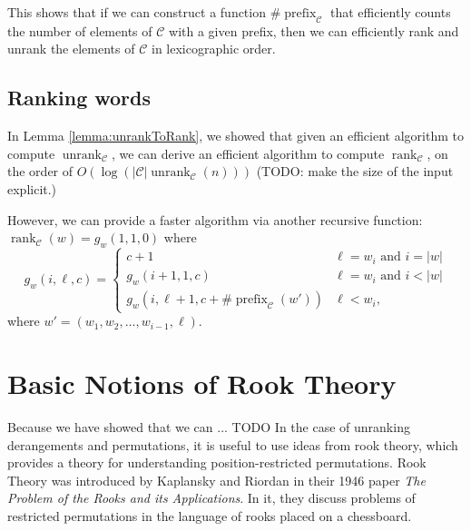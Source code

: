 This shows that if we can construct a function
$\#\operatorname{prefix}_\mathcal{C}$ that efficiently counts the number of
elements of $\mathcal{C}$ with a given prefix, then we can efficiently rank and
unrank the elements of $\mathcal{C}$ in lexicographic order.

\subsection{Ranking words}
In Lemma \ref{lemma:unrankToRank}, we showed that given an efficient algorithm
to compute $\operatorname{unrank}_\mathcal{C}$, we can derive an efficient
algorithm to compute $\operatorname{rank}_\mathcal{C}$, on the order of
$O(\log(|\mathcal{C}|\operatorname{unrank}_\mathcal{C}(n)))$
(TODO: make the size of the input explicit.)

However, we can provide a faster algorithm via another recursive function:
$\operatorname{rank}_\mathcal{C}(w) = g_w(1,1,0)$ where
\begin{equation}
  g_w(i, \ell, c) = \begin{cases}
    c + 1 & \ell = w_i \text{ and } i = |w| \\
    g_w(i + 1, 1, c) & \ell = w_i \text{ and } i < |w| \\
    g_w(i, \ell + 1, c + \#\operatorname{prefix}_\mathcal{C}(w')) & \ell < w_i,
  \end{cases}
\end{equation}
where $w' = (w_1, w_2, \dots, w_{i-1}, \ell)$.

\section{Basic Notions of Rook Theory}
Because we have showed that we can ... TODO
In the case of unranking derangements and permutations, it is useful to use
ideas from rook theory, which provides a theory for understanding
position-restricted permutations.
Rook Theory was introduced by Kaplansky and Riordan \cite{Kaplansky1946}
in their 1946 paper \textit{The Problem of the Rooks and its Applications}. In
it, they discuss problems of restricted permutations in the language of rooks
placed on a chessboard.

